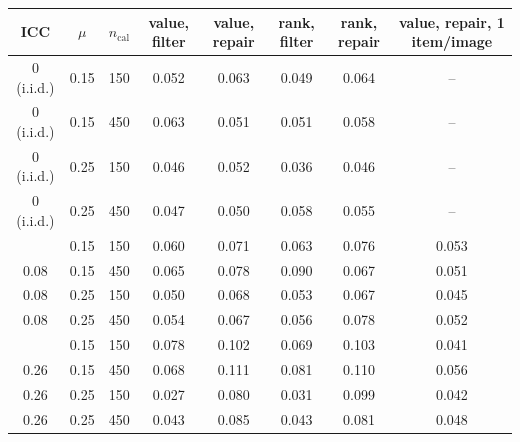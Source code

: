 \begin{tabular}{cccccccc}
\toprule
ICC & $\mu$ & $n_{\mathrm{cal}}$ & value, filter & value, repair & rank, filter & rank, repair & value, repair, 1 item/image\\
\midrule
0 (i.i.d.) & 0.15 & 150 & 0.052 & 0.063 & 0.049 & 0.064 & --\\
0 (i.i.d.) & 0.15 & 450 & 0.063 & 0.051 & 0.051 & 0.058 & --\\
0 (i.i.d.) & 0.25 & 150 & 0.046 & 0.052 & 0.036 & 0.046 & --\\
0 (i.i.d.) & 0.25 & 450 & 0.047 & 0.050 & 0.058 & 0.055 & --\\
\addlinespace
0.08 & 0.15 & 150 & 0.060 & 0.071 & 0.063 & 0.076 & 0.053\\
0.08 & 0.15 & 450 & 0.065 & 0.078 & 0.090 & 0.067 & 0.051\\
0.08 & 0.25 & 150 & 0.050 & 0.068 & 0.053 & 0.067 & 0.045\\
0.08 & 0.25 & 450 & 0.054 & 0.067 & 0.056 & 0.078 & 0.052\\
\addlinespace
0.26 & 0.15 & 150 & 0.078 & 0.102 & 0.069 & 0.103 & 0.041\\
0.26 & 0.15 & 450 & 0.068 & 0.111 & 0.081 & 0.110 & 0.056\\
0.26 & 0.25 & 150 & 0.027 & 0.080 & 0.031 & 0.099 & 0.042\\
0.26 & 0.25 & 450 & 0.043 & 0.085 & 0.043 & 0.081 & 0.048\\
\bottomrule
\end{tabular}
